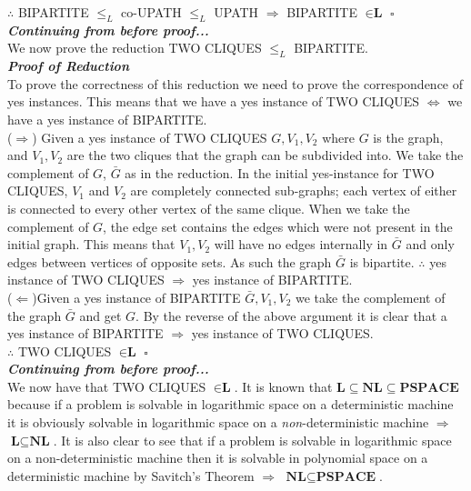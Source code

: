 \documentclass[12pt]{article}
\begin{document}
\begin{enumerate}
\begin{enumerate}
$\therefore $ BIPARTITE $\leq_{L} $ co-UPATH $\leq_{L} $ UPATH $\Rightarrow $ BIPARTITE $\in \textbf{L} $ $\square $\\
\textit{\textbf{Continuing from before proof...}}\\
We now prove the reduction TWO CLIQUES $\leq _{L}$ BIPARTITE. \\ 
\textit{\textbf{Proof of Reduction}}\\  
To prove the correctness of this reduction we need to prove the correspondence of yes instances. This means that we have a yes instance of TWO CLIQUES $\iff $ we have a yes instance of BIPARTITE.\\
($\Rightarrow $) Given a yes instance of TWO CLIQUES $G, V_1, V_2$ where $G$ is the graph, and $V_1,V_2$ are the two cliques that the graph can be subdivided into. We take the complement of $G$, $\bar{G}$ as in the reduction. In the initial yes-instance for TWO CLIQUES, $V_1$ and $V_2$ are  completely connected sub-graphs; each vertex of either is connected to every other vertex of the same clique. When we take the complement of $G$, the edge set contains the edges which were not present in the initial graph. This means that $V_1,V_2$ will have no edges internally in $\bar{G}$ and only edges between vertices of opposite sets. As such the graph $\bar{G}$ is bipartite. $\therefore $ yes instance of TWO CLIQUES $\Rightarrow $  yes instance of BIPARTITE.
\\
($\Leftarrow $)Given a yes instance of BIPARTITE $\bar{G}, V_1, V_2 $ we take the complement of the graph $\bar{G} $ and get $G$. By the reverse of the above argument it is clear that a yes instance of BIPARTITE $\Rightarrow $ yes instance of TWO CLIQUES.
\\
$\therefore $ TWO CLIQUES $\in \textbf{L} $ $\square $ \\
\textit{\textbf{Continuing from before proof...}}\\  
We now have that TWO CLIQUES $\in \textbf{L}$. It is known that $\textbf{L} \subseteq \textbf{NL} \subseteq \textbf{PSPACE} $ because if a problem is solvable in logarithmic space on a deterministic machine it is obviously solvable in logarithmic space on a \textit{non}-deterministic machine $\Rightarrow $ $\textbf{L} \subseteq \textbf{NL} $. It is also clear to see that if a problem is solvable in logarithmic space on a non-deterministic machine then it is solvable in polynomial space on a deterministic machine by Savitch's Theorem $\Rightarrow$  $\textbf{NL} \subseteq \textbf{PSPACE} $. \\

\end{enumerate}
\end{enumerate}
\end{document}
